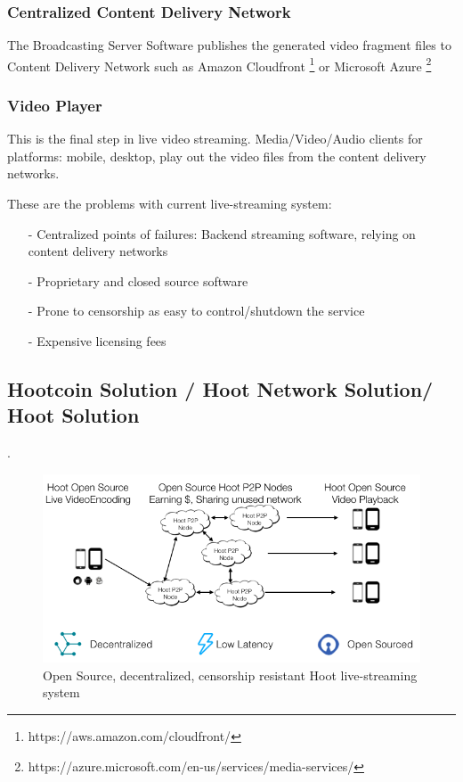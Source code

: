 \documentclass{article}
\begin{document}
\subsubsection{Centralized Content Delivery Network}
The Broadcasting Server Software publishes the generated video fragment files to Content Delivery Network such as Amazon Cloudfront \footnote{https://aws.amazon.com/cloudfront/} or Microsoft Azure \footnote{https://azure.microsoft.com/en-us/services/media-services/}

\subsubsection{Video Player}
This is the final step in live video streaming. Media/Video/Audio clients for platforms: mobile, desktop, play out the video files from the content delivery networks.


These are the problems with current live-streaming system:
\begin{itemize}
  \item[-]Centralized points of failures: Backend streaming software, relying on content delivery networks
  \item[-]Proprietary and closed source software
  \item[-]Prone to censorship as easy to control/shutdown the service
  \item[-]Expensive licensing fees
\end{itemize}

\subsection{Hootcoin Solution / Hoot Network Solution/ Hoot Solution}
 .

\begin{figure}[h!]
  \centering
  \includegraphics[width=1.0\textwidth]{static/hoot-solution}
  \caption{Open Source, decentralized, censorship resistant Hoot live-streaming system}
  \label{image:hoot-solution}
\end{figure}
\end{document}
